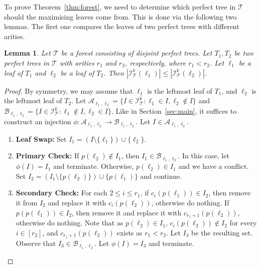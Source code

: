 \documentclass[11pt]{article}
\newtheorem{lemma}[theorem]{Lemma}
\theoremstyle{definition}
\newcommand{\cI}{\mathcal{I}}
\begin{document}
To prove Theorem~\ref{thm:forest}, we need to determine which perfect tree in $\mathcal{T}$ should the maximising leaves come from. This is done via the following two lemmas. The first one compares the leaves of two perfect trees with different arities. 

\begin{lemma}\label{lemma:differentarity}
Let $\mathcal{T}$ be a forest consisting of disjoint perfect trees. Let $T_1, T_2$ be two perfect trees in $\mathcal{T}$ with arities $r_1$ and $r_2$, respectively, where $r_1 < r_2$. Let $\ell_1$ be a leaf of $T_1$ and $\ell_2$ be a leaf of $T_2$. Then $|\mathcal{I}_{\mathcal{T}}^{k}(\ell_1)| \le |\mathcal{I}_{\mathcal{T}}^{k}(\ell_2)|$.
\end{lemma}
\begin{proof}
By symmetry, we may assume that $\ell_1$ is the leftmost leaf of $T_1$, and $\ell_2$ is the leftmost leaf of $T_2$. Let $\mathcal{A}_{\ell_1,\ell_2}=\{I\in\cI^k_{\mathcal{T}}:\ell_1\in I, \ell_2\not\in I\}$ and $\mathcal{B}_{\ell_1,\ell_2}=\{I\in\cI^k_{\mathcal{T}}:\ell_1\not\in I, \ell_2\in I\}$. Like in Section~\ref{sec:main}, it suffices to construct an injection $\phi: \mathcal{A}_{\ell_1,\ell_2}\to\mathcal{B}_{\ell_1,\ell_2}$. Let $I \in \mathcal{A}_{\ell_1,\ell_2}$.
\begin{enumerate}
    \item\textbf{Leaf Swap:} Set $I_1= (I \setminus \{\ell_1\}) \cup \{\ell_2\}$.
    \item\textbf{Primary Check:} If $p(\ell_2)\not\in I_1$, then $I_1\in\mathcal{B}_{\ell_1,\ell_2}$. In this case, let $\phi(I)=I_1$ and terminate. Otherwise, $p(\ell_2)\in I_1$ and we have a conflict. Set $I_2=(I_1\setminus\{p(\ell_2)\})\cup\{p(\ell_1)\}$ and continue.
    \item\textbf{Secondary Check:} For each $2\leq i\leq r_1$, if $c_i(p(\ell_1))\in I_2$, then remove it from $I_2$ and replace it with $c_i(p(\ell_2))$, otherwise do nothing. If $p(p(\ell_1))\in I_2$, then remove it and replace it with $c_{r_1+1}(p(\ell_2))$, otherwise do nothing. Note that as $p(\ell_2)\in I_1$, $c_i(p(\ell_2))\not\in I_2$ for every $i\in[r_2]$, and $c_{r_1+1}(p(\ell_2))$ exists as $r_1<r_2$. Let $I_3$ be the resulting set. Observe that $I_3\in\mathcal{B}_{\ell_1,\ell_2}$. Let $\phi(I)=I_3$ and terminate.

\end{enumerate}
\end{proof}
\end{document}

